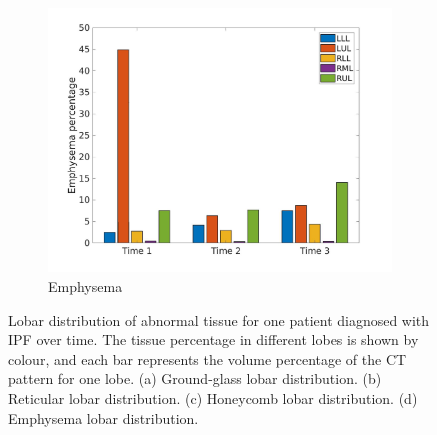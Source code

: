 \begin{figure}[H]
\begin{subfigure}{.46\linewidth}
  \includegraphics[width=\linewidth,trim={{.0\wd0} {.0\wd0} {.0\wd0} {.0\wd0}},clip]{QuantitativeAnalysis/Image/IPF15EmphysemaLobarRegionDiseaseDistributionOverTime.jpg}
  \caption{Emphysema}
  \label{fig:IPF15LobarRegionDiseaseDistributionOverTimeMain-d}
\end{subfigure}
\caption{Lobar distribution of abnormal tissue for one patient diagnosed with IPF over time. The tissue percentage in different lobes is shown by colour, and each bar represents the volume percentage of the CT pattern for one lobe. (a) Ground-glass lobar distribution. (b) Reticular lobar distribution. (c) Honeycomb lobar distribution. (d) Emphysema lobar distribution.}
\label{fig:IPF15LobarRegionDiseaseDistributionOverTimeMain}
\end{figure}

